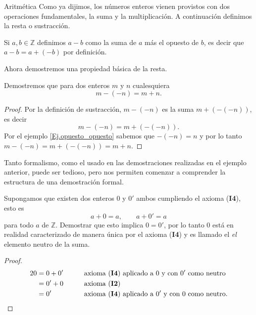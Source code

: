 \begin{section}{Aritmética}
Como ya dijimos, los números enteros vienen provistos con dos operaciones fundamentales, la suma y la multiplicación.
A continuación definimos la resta o sustracción. 

\begin{definicion} Si $a,b\in\mathbb{Z}$ definimos $a-b$ como la suma de $a$ más el opuesto de $b$, es decir que 
$a-b=a+(-b)$ por definición. 
\end{definicion}

Ahora demostremos una propiedad básica de la resta.

\begin{ejemplo} Demostremos que para dos enteros $m$ y $n$ cualesquiera
$$m-(-n) = m+n.$$ 
\end{ejemplo}
\begin{proof} Por la definición de sustracción, $m-(-n)$ es la suma $m+(-(-n))$, es decir 
$$m-(-n)=m+(-(-n)).$$ 
Por el ejemplo \ref{Ej.opuesto_opuesto} sabemos que $-(-n)=n$ y por lo tanto $m-(-n)=m+(-(-n))=m+n$.
\end{proof}

Tanto formalismo, como el usado en las demostraciones realizadas en el ejemplo anterior, puede ser tedioso, pero nos permiten comenzar a comprender la estructura de una demostración formal. 



\begin{ejemplo} Supongamos que existen dos enteros $0$ y $0'$ ambos cumpliendo el
 axioma ({\bf I4}), esto es
$$
a+0= a, \qquad a+0'=a
$$
para todo $a$ de $\mathbb Z$. Demostrar que esto implica $0=0'$,
por lo tanto $0$ está en realidad caracterizado de manera única por
el axioma ({\bf I4}) y es llamado el {\em el} elemento neutro de la suma.
\end{ejemplo}
\begin{proof}
\begin{alignat*}2
0 &= 0 + 0'&\qquad &\text{axioma ({\bf I4}) aplicado a $0$ y con $0'$ como neutro} \\
&=0'+0&\qquad &\text{axioma ({\bf I2})}\\
&= 0' &\qquad &\text{axioma ({\bf I4}) aplicado a $0'$ y con $0$ como neutro}.
\end{alignat*}
\end{proof}

%
%
%
%
%



\end{section}
